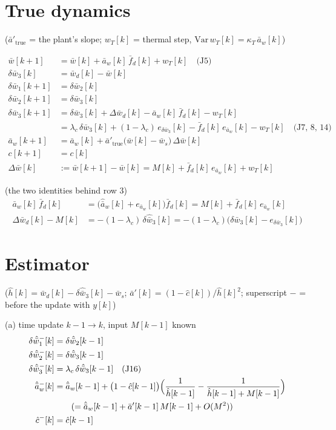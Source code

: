\documentclass[11pt,a4paper,fontset=none]{ctexart}
\newcommand{\ba}{\bar{a}}
\newcommand{\bw}{\bar{w}}
\newcommand{\dW}{\Delta\bw}
\newcommand{\ap}{\ba'}
\newcommand{\ah}{\hat{\ba}_w}
\newcommand{\hh}{\hat{h}}
\newcommand{\ch}{\hat{c}}
\newcommand{\lc}{\lambda_c}
\newcommand{\fd}{\bar{f}_d}
\newcommand{\J}[1]{\quad\text{(J#1)}}
\begin{document}
\section{True dynamics}

($\ap_{\mathrm{true}}$ = the plant's slope; $w_T[k]$ = thermal step, $\mathrm{Var}\,w_T[k] = \kappa_T\,\ba_w[k]$)

\begin{align*}
\bw[k+1]         &= \bw[k] + \ba_w[k]\,\fd[k] + w_T[k] \J{5} \\
\delta\bw_3[k]   &= \bw_d[k] - \bw[k] \\
\delta\bw_1[k+1] &= \delta\bw_2[k] \\
\delta\bw_2[k+1] &= \delta\bw_3[k] \\
\delta\bw_3[k+1] &= \delta\bw_3[k] + \dW_d[k] - \ba_w[k]\,\fd[k] - w_T[k] \\
                 &= \lc\,\delta\bw_3[k] + (1-\lc)\,e_{\delta\bw_3}[k] - \fd[k]\,e_{\ba_w}[k] - w_T[k] \J{7, 8, 14} \\
\ba_w[k+1]       &= \ba_w[k] + \ap_{\mathrm{true}}\bigl(\bw[k]-\bw_s\bigr)\,\dW[k] \\
c[k+1]           &= c[k] \\[4pt]
\dW[k]           &:= \bw[k+1] - \bw[k] = M[k] + \fd[k]\,e_{\ba_w}[k] + w_T[k]
\end{align*}

(the two identities behind row 3)
\begin{align*}
\ba_w[k]\,\fd[k]       &= \bigl(\ah[k] + e_{\ba_w}[k]\bigr)\fd[k] = M[k] + \fd[k]\,e_{\ba_w}[k] \\
\dW_d[k] - M[k]        &= -(1-\lc)\,\delta\hat{\bw}_3[k] = -(1-\lc)\bigl(\delta\bw_3[k] - e_{\delta\bw_3}[k]\bigr)
\end{align*}

\section{Estimator}

($\hh[k] = \bw_d[k] - \delta\hat{\bw}_3[k] - \bw_s$; $\ap[k] = (1-\ch[k])/\hh[k]^{2}$; superscript $-$ = before the update with $y[k]$)

(a) time update $k-1 \to k$, input $M[k-1]$ known
\begin{align*}
\delta\hat{\bw}_1^{-}[k] &= \delta\hat{\bw}_2[k-1] \\
\delta\hat{\bw}_2^{-}[k] &= \delta\hat{\bw}_3[k-1] \\
\delta\hat{\bw}_3^{-}[k] &= \lc\,\delta\hat{\bw}_3[k-1] \J{16} \\
\ah^{-}[k]               &= \ah[k-1] + \bigl(1 - \ch[k-1]\bigr)\Bigl(\frac{1}{\hh[k-1]} - \frac{1}{\hh[k-1] + M[k-1]}\Bigr) \\
                         &\qquad(= \ah[k-1] + \ap[k-1]\,M[k-1] + O(M^{2})) \\
\ch^{-}[k]               &= \ch[k-1]
\end{align*}
\end{document}

